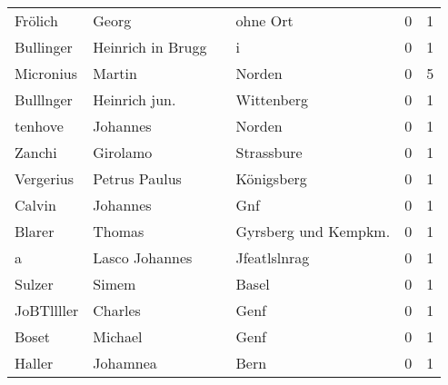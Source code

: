 \begin{tabular}{llllrr}
                  Frölich &                              Georg &             &                                    ohne Ort &          0 &         1 \\
                Bullinger &                  Heinrich in Brugg &             &                                           i &          0 &         1 \\
                Micronius &                             Martin &             &                                      Norden &          0 &         5 \\
                Bulllnger &                      Heinrich jun. &             &                                  Wittenberg &          0 &         1 \\
                  tenhove &                           Johannes &             &                                      Norden &          0 &         1 \\
                   Zanchi &                           Girolamo &             &                                  Strassbure &          0 &         1 \\
                Vergerius &                      Petrus Paulus &             &                                  Königsberg &          0 &         1 \\
                   Calvin &                           Johannes &             &                                         Gnf &          0 &         1 \\
                   Blarer &                             Thomas &             &                       Gyrsberg und Kempkm.  &          0 &         1 \\
                        a &                     Lasco Johannes &             &                                Jfeatlslnrag &          0 &         1 \\
                   Sulzer &                              Simem &             &                                       Basel &          0 &         1 \\
               JoBTllller &                            Charles &             &                                        Genf &          0 &         1 \\
                    Boset &                            Michael &             &                                        Genf &          0 &         1 \\
                   Haller &                           Johamnea &             &                                        Bern &          0 &         1 \\

\end{tabular}
